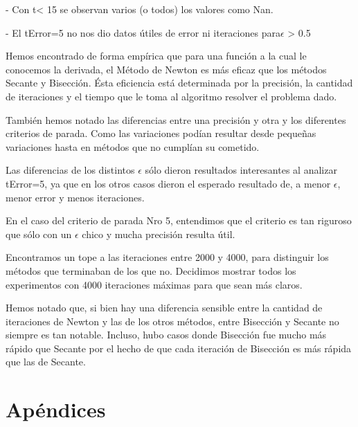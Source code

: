\documentclass[10pt, a4paper]{article}
\begin{document}
 - Con t< 15 se observan varios (o todos) los valores como Nan.\newline

 - El tError=5 no nos dio datos \'utiles de error ni iteraciones para$ \epsilon$ > 0.5\newline

Hemos encontrado de forma emp\'irica que para una funci\'on a la cual le conocemos la derivada, el M\'etodo de Newton es más eficaz que los métodos Secante y Bisecci\'on. \'Esta eficiencia est\'a determinada por la precisi\'on, la cantidad de iteraciones y el tiempo que le toma al algoritmo resolver el problema dado.

Tambi\'en hemos notado las diferencias entre una precisi\'on y otra y los diferentes criterios de parada. Como las variaciones pod\'ian resultar desde pequeñas variaciones hasta en m\'etodos que no cumpl\'ian su cometido.

Las diferencias de los distintos $\epsilon$ s\'olo dieron resultados interesantes al analizar tError=5, ya que en los otros casos dieron el esperado resultado de, a menor $\epsilon$, menor error y menos iteraciones.

En el caso del criterio de parada Nro 5, entendimos que el criterio es tan riguroso que s\'olo con un $\epsilon$ chico y mucha precisi\'on resulta \'util.

Encontramos un tope a las iteraciones entre 2000 y 4000, para distinguir los m\'etodos que terminaban de los que no. Decidimos mostrar todos los experimentos con 4000 iteraciones máximas para que sean m\'as claros.

Hemos notado que, si bien hay una diferencia sensible entre la cantidad de iteraciones de Newton y las de los otros m\'etodos, entre Bisecci\'on y Secante no siempre es tan notable. Incluso, hubo casos donde Bisecci\'on fue mucho más r\'apido que Secante por el hecho de que cada iteración de Bisecci\'on es más r\'apida que las de Secante.

\section{Ap\'endices}
\end{document}
